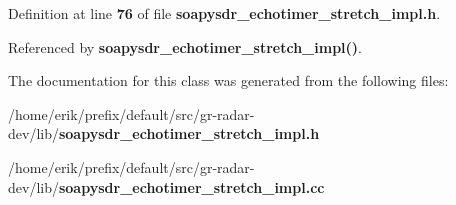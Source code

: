 Definition at line {\bf 76} of file {\bf soapysdr\+\_\+echotimer\+\_\+stretch\+\_\+impl.\+h}.



Referenced by {\bf soapysdr\+\_\+echotimer\+\_\+stretch\+\_\+impl()}.



The documentation for this class was generated from the following files\+:\begin{DoxyCompactItemize}
\item 
/home/erik/prefix/default/src/gr-\/radar-\/dev/lib/{\bf soapysdr\+\_\+echotimer\+\_\+stretch\+\_\+impl.\+h}\item 
/home/erik/prefix/default/src/gr-\/radar-\/dev/lib/{\bf soapysdr\+\_\+echotimer\+\_\+stretch\+\_\+impl.\+cc}\end{DoxyCompactItemize}
